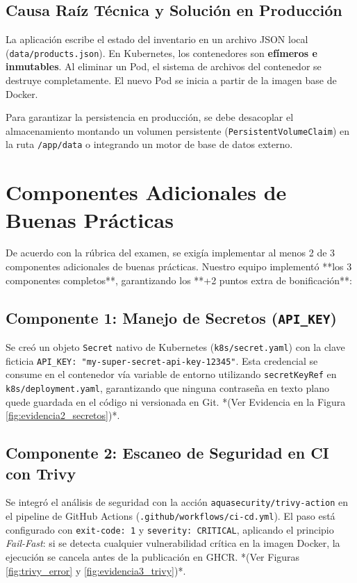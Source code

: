 \documentclass[11pt,a4paper]{article}
\begin{document}
\subsection{Causa Raíz Técnica y Solución en Producción}
La aplicación escribe el estado del inventario en un archivo JSON local (\texttt{data/products.json}). En Kubernetes, los contenedores son \textbf{efímeros e inmutables}. Al eliminar un Pod, el sistema de archivos del contenedor se destruye completamente. El nuevo Pod se inicia a partir de la imagen base de Docker.

Para garantizar la persistencia en producción, se debe desacoplar el almacenamiento montando un volumen persistente (\texttt{PersistentVolumeClaim}) en la ruta \texttt{/app/data} o integrando un motor de base de datos externo.

\section{Componentes Adicionales de Buenas Prácticas}

De acuerdo con la rúbrica del examen, se exigía implementar al menos 2 de 3 componentes adicionales de buenas prácticas. Nuestro equipo implementó **los 3 componentes completos**, garantizando los **+2 puntos extra de bonificación**:

\subsection{Componente 1: Manejo de Secretos (\texttt{API\_KEY})}
Se creó un objeto \texttt{Secret} nativo de Kubernetes (\texttt{k8s/secret.yaml}) con la clave ficticia \texttt{API\_KEY: "my-super-secret-api-key-12345"}. Esta credencial se consume en el contenedor vía variable de entorno utilizando \texttt{secretKeyRef} en \texttt{k8s/deployment.yaml}, garantizando que ninguna contraseña en texto plano quede guardada en el código ni versionada en Git. *(Ver Evidencia en la Figura \ref{fig:evidencia2_secretos})*.

\subsection{Componente 2: Escaneo de Seguridad en CI con Trivy}
Se integró el análisis de seguridad con la acción \texttt{aquasecurity/trivy-action} en el pipeline de GitHub Actions (\texttt{.github/workflows/ci-cd.yml}). El paso está configurado con \texttt{exit-code: 1} y \texttt{severity: CRITICAL}, aplicando el principio \textit{Fail-Fast}: si se detecta cualquier vulnerabilidad crítica en la imagen Docker, la ejecución se cancela antes de la publicación en GHCR. *(Ver Figuras \ref{fig:trivy_error} y \ref{fig:evidencia3_trivy})*.
\end{document}
